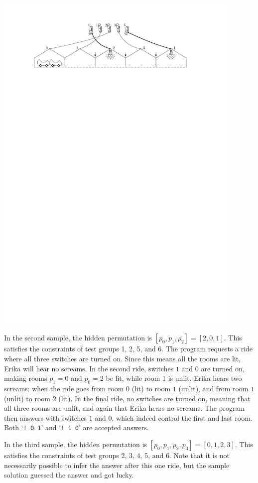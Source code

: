  
\begin{center}
    \includegraphics[width=0.9\textwidth]{sample.pdf}
  \end{center}

In the second sample, the hidden permutation is $[p_{0},p_{1},p_{2}] = [2,0,1]$.
This satisfies the constraints of test groups 1, 2, 5, and 6.
The program requests a ride where all three switches are turned on. Since this means all the rooms are lit, Erika will hear no screams. In the second ride, switches $1$ and $0$ are turned on, making rooms $p_{1} = 0$ and $p_{0} = 2$ be lit, while room $1$ is unlit. Erika hears two screams: when the ride goes from room $0$ (lit) to room $1$ (unlit), and from room $1$ (unlit) to room $2$ (lit). In the final ride, no switches are turned on, meaning that all three rooms are unlit, and again that Erika hears no screams. The program then answers with switches $1$ and $0$, which indeed control the first and last room. Both `\verb|! 0 1|' and `\verb|! 1 0|' are accepted answers.

In the third sample, the hidden permutation is $[p_{0},p_{1},p_{2},p_{3}] = [0,1,2,3]$. This satisfies the constraints of test groups 2, 3, 4, 5, and 6. Note that it is not necessarily possible to infer the answer after this one ride, but the sample solution guessed the answer and got lucky.
